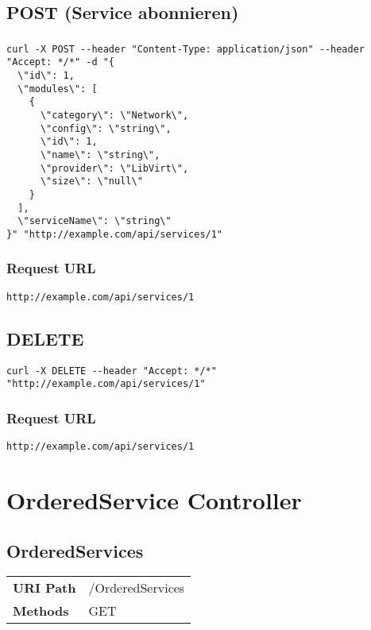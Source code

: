 \subsection{POST (Service abonnieren)}
\subsubsection{}
\begin{lstlisting}[style=Bash] 
curl -X POST --header "Content-Type: application/json" --header "Accept: */*" -d "{
  \"id\": 1,
  \"modules\": [
    {
      \"category\": \"Network\",
      \"config\": \"string\",
      \"id\": 1,
      \"name\": \"string\",
      \"provider\": \"LibVirt\",
      \"size\": \"null\"
    }
  ],
  \"serviceName\": \"string\"
}" "http://example.com/api/services/1"
\end{lstlisting}

\subsubsection{Request URL}
\begin{lstlisting}[] 
http://example.com/api/services/1
\end{lstlisting}




\subsection{DELETE}
\begin{lstlisting}[style=Bash] 
  curl -X DELETE --header "Accept: */*" "http://example.com/api/services/1"
\end{lstlisting}

\subsubsection{Request URL}
\begin{lstlisting}[] 
http://example.com/api/services/1
\end{lstlisting}

\section{OrderedService Controller}
\subsection{OrderedServices}
\begin{tabularx}{\linewidth}{l l}
\textbf{URI Path} & /OrderedServices\\
\textbf{Methods} & GET\\
\end{tabularx}

